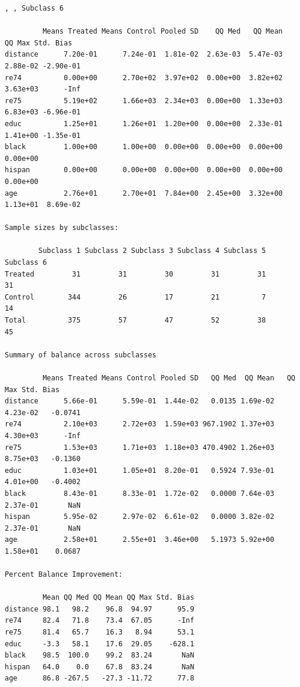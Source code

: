 \documentclass[oneside,letterpaper,titlepage]{article}
\begin{document}
\begin{verbatim}
, , Subclass 6

         Means Treated Means Control Pooled SD    QQ Med   QQ Mean    QQ Max Std. Bias
distance      7.20e-01      7.24e-01  1.81e-02  2.63e-03  5.47e-03  2.88e-02 -2.90e-01
re74          0.00e+00      2.70e+02  3.97e+02  0.00e+00  3.82e+02  3.63e+03      -Inf
re75          5.19e+02      1.66e+03  2.34e+03  0.00e+00  1.33e+03  6.83e+03 -6.96e-01
educ          1.25e+01      1.26e+01  1.20e+00  0.00e+00  2.33e-01  1.41e+00 -1.35e-01
black         1.00e+00      1.00e+00  0.00e+00  0.00e+00  0.00e+00  0.00e+00          
hispan        0.00e+00      0.00e+00  0.00e+00  0.00e+00  0.00e+00  0.00e+00          
age           2.76e+01      2.70e+01  7.84e+00  2.45e+00  3.32e+00  1.13e+01  8.69e-02
        
Sample sizes by subclasses:

        Subclass 1 Subclass 2 Subclass 3 Subclass 4 Subclass 5 Subclass 6
Treated         31         31         30         31         31         31
Control        344         26         17         21          7         14
Total          375         57         47         52         38         45

Summary of balance across subclasses

         Means Treated Means Control Pooled SD   QQ Med  QQ Mean   QQ Max Std. Bias
distance      5.66e-01      5.59e-01  1.44e-02   0.0135 1.69e-02 4.23e-02   -0.0741
re74          2.10e+03      2.72e+03  1.59e+03 967.1902 1.37e+03 4.30e+03      -Inf
re75          1.53e+03      1.71e+03  1.18e+03 470.4902 1.26e+03 8.75e+03   -0.1360
educ          1.03e+01      1.05e+01  8.20e-01   0.5924 7.93e-01 4.01e+00   -0.4002
black         8.43e-01      8.33e-01  1.72e-02   0.0000 7.64e-03 2.37e-01       NaN
hispan        5.95e-02      2.97e-02  6.61e-02   0.0000 3.82e-02 2.37e-01       NaN
age           2.58e+01      2.55e+01  3.46e+00   5.1973 5.92e+00 1.58e+01    0.0687
        
Percent Balance Improvement:

         Mean QQ Med QQ Mean QQ Max Std. Bias
distance 98.1   98.2    96.8  94.97      95.9
re74     82.4   71.8    73.4  67.05      -Inf
re75     81.4   65.7    16.3   8.94      53.1
educ     -3.3   58.1    17.6  29.05    -628.1
black    98.5  100.0    99.2  83.24       NaN
hispan   64.0    0.0    67.8  83.24       NaN
age      86.8 -267.5   -27.3 -11.72      77.8
\end{verbatim}
\end{document}

